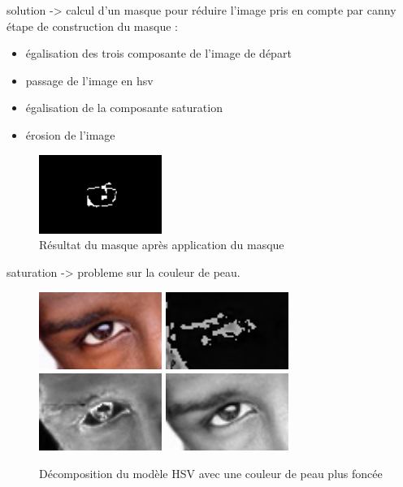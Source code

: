 solution -> calcul d'un masque pour réduire l'image pris en compte par canny
étape de construction du masque : 
\begin{itemize}
 \item égalisation des trois composante de l'image de départ
 \item passage de l'image en hsv
 \item égalisation de la composante saturation%
 \item érosion de l'image
\end{itemize}

\begin{figure}[H]
 \center
 \includegraphics[width=4cm]{image/resultatMasque.png}
 \caption{Résultat du masque après application du masque}
\end{figure}

saturation -> probleme sur la couleur de peau.

\begin{figure}[H]
 \center
 \includegraphics[width=4cm]{image/original_black.png}
 \includegraphics[width=4cm]{image/hue_black.png}
 \includegraphics[width=4cm]{image/saturation_black.png}
 \includegraphics[width=4cm]{image/value_black.png}
 \caption{Décomposition du modèle HSV avec une couleur de peau plus foncée}
\end{figure}

